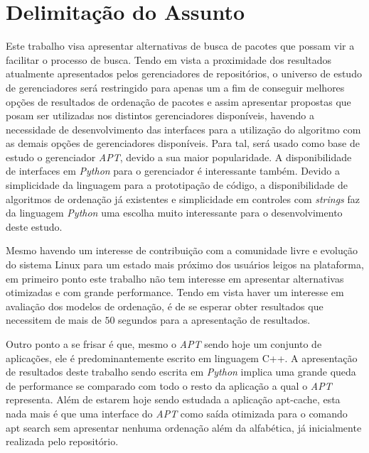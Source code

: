 \chapter{\nmu Delimitação do \nmu Assunto}
\label{cha:delimitacao}

Este trabalho visa apresentar alternativas de busca de pacotes que possam vir a facilitar  o processo de busca. Tendo em vista a proximidade dos resultados atualmente apresentados pelos gerenciadores de repositórios, o universo de estudo de gerenciadores será restringido para apenas um a fim de conseguir melhores opções de resultados de ordenação de pacotes e assim apresentar propostas que posam ser utilizadas nos distintos gerenciadores disponíveis, havendo a necessidade de desenvolvimento das interfaces para a utilização do algoritmo com as demais opções de gerenciadores disponíveis. Para tal, será usado como base de estudo o gerenciador \textit{APT}, devido a sua maior popularidade. A disponibilidade de  interfaces em \textit{Python} para o gerenciador é interessante também. Devido a simplicidade da linguagem para a prototipação de código, a disponibilidade de algoritmos de ordenação já existentes e simplicidade em controles com \textit{strings} faz da linguagem \textit{Python} uma escolha muito interessante para o desenvolvimento deste estudo.

Mesmo havendo um interesse de contribuição com a comunidade livre e evolução do sistema Linux para um estado mais próximo dos usuários leigos na plataforma, em primeiro ponto este trabalho não tem interesse em apresentar alternativas otimizadas e com grande performance. Tendo em vista haver um interesse em avaliação dos modelos de ordenação, é de se esperar obter resultados que necessitem de mais de $50$ segundos para a apresentação de resultados.

Outro ponto a se frisar é que, mesmo o \textit{APT} sendo hoje um conjunto de aplicações, ele é predominantemente escrito em linguagem C++. A apresentação de resultados deste trabalho sendo escrita em \textit{Python} implica uma grande queda de performance se comparado com todo o resto da aplicação a qual o \textit{APT} representa. Além de estarem hoje sendo estudada a aplicação {\code apt-cache}, esta nada mais é que uma interface do \textit{APT} como saída otimizada para o comando {\code apt search} sem apresentar nenhuma ordenação além da alfabética, já inicialmente realizada pelo repositório.
